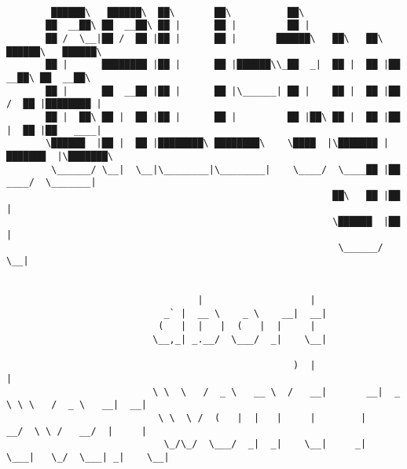 \documentclass[varwidth=\maxdimen,margin=0.5cm,multi={verbatim}]{standalone}
\begin{document}
\begin{verbatim}

        ██████\   ██████\  ██\       ██\          ██\
       ██  __██\ ██  __██\ ██ |      ██ |         ██ |
       ██ /  \__|██ /  ██ |██ |      ██ |       ██████\   ██\   ██\  ██████\   ██████\
       ██ |      ████████ |██ |      ██ |██████\\_██  _|  ██ |  ██ |██  __██\ ██  __██\
       ██ |      ██  __██ |██ |      ██ |\______| ██ |    ██ |  ██ |██ /  ██ |████████ |
       ██ |  ██\ ██ |  ██ |██ |      ██ |         ██ |██\ ██ |  ██ |██ |  ██ |██   ____|
       \██████  |██ |  ██ |████████\ ████████\    \████  |\███████ |███████  |\███████\
        \______/ \__|  \__|\________|\________|    \____/  \____██ |██  ____/  \_______|
                                                          ██\   ██ |██ |
                                                          \██████  |██ |
                                                           \______/ \__|


                                  |                   |
                            _` |  __ \    _ \    __|  __|
                           (   |  |   |  (   |  |     |
                          \__,_| _.__/  \___/  _|    \__|

                                                   )  |                                      |
                          \ \  \   /  _ \   __ \  /   __|       __|  _ \ \ \   /  _ \   __|  __|
                           \ \  \ /  (   |  |   |     |        |     __/  \ \ /   __/  |     |
                            \_/\_/  \___/  _|  _|    \__|     _|   \___|   \_/  \___| _|    \__|



\end{verbatim}
\end{document}
